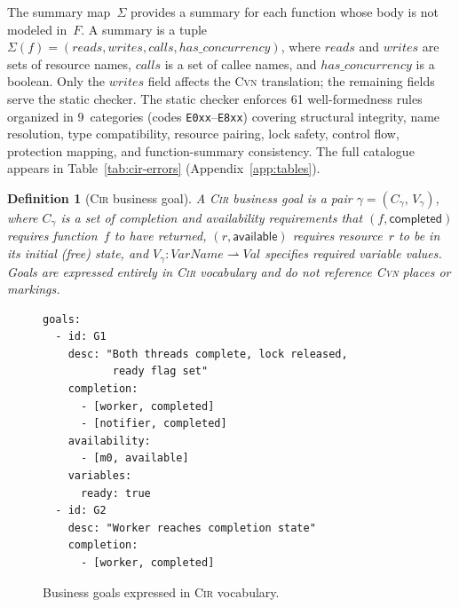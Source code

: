 \documentclass[sigconf]{acmart}
\newtheorem{definition}{Definition}
\begin{document}
The summary map~$\Sigma$ provides a summary for each function whose body is not modeled in~$F$. A summary is a tuple $\Sigma(f)=(\mathit{reads},\mathit{writes},\mathit{calls},\mathit{has\_concurrency})$, where $\mathit{reads}$ and $\mathit{writes}$ are sets of resource names, $\mathit{calls}$ is a set of callee names, and $\mathit{has\_concurrency}$ is a boolean. Only the $\mathit{writes}$ field affects the \textsc{Cvn} translation; the remaining fields serve the static checker. The static checker enforces 61 well-formedness rules organized in 9~categories (codes \texttt{E0xx}--\texttt{E8xx}) covering structural integrity, name resolution, type compatibility, resource pairing, lock safety, control flow, protection mapping, and function-summary consistency. The full catalogue appears in Table~\ref{tab:cir-errors} (Appendix~\ref{app:tables}).

\begin{definition}[\textsc{Cir} business goal]
  \label{def:cir-goal}
  A \textsc{Cir} business goal is a pair $\gamma=(C_\gamma,\,V_\gamma)$, where $C_\gamma$ is a set of \emph{completion} and
  \emph{availability} requirements that $(f,\textsf{completed})$ requires function~$f$ to have returned, $(r,\textsf{available})$ requires resource~$r$ to be in its initial (free) state, and $V_\gamma:\mathit{VarName}\rightharpoonup\mathit{Val}$ specifies required variable values. Goals are expressed entirely in \textsc{Cir} vocabulary and do not
  reference \textsc{Cvn} places or markings.
\end{definition}

\begin{figure}[t]
\begin{lstlisting}[basicstyle=\small\ttfamily,frame=single]
goals:
  - id: G1
    desc: "Both threads complete, lock released,
           ready flag set"
    completion:
      - [worker, completed]
      - [notifier, completed]
    availability:
      - [m0, available]
    variables:
      ready: true
  - id: G2
    desc: "Worker reaches completion state"
    completion:
      - [worker, completed]
\end{lstlisting}
\caption{Business goals expressed in \textsc{Cir} vocabulary.}
\label{fig:goals-example}
\end{figure}
\end{document}
